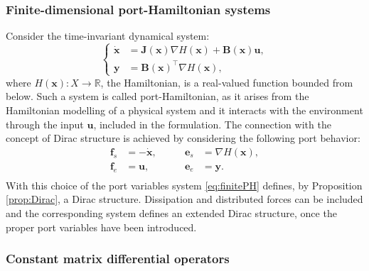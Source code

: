 \subsubsection{Finite-dimensional port-Hamiltonian systems}
Consider the time-invariant dynamical system:
\begin{equation}
\label{eq:finitePH}
\begin{cases}
\dot{ \mathbf{x} } &= \mathbf{J}(\mathbf{x}) \nabla H(\mathbf{x}) + \mathbf{B}(\mathbf{x})\mathbf{u}, \\
\mathbf{y} &= \mathbf{B}(\mathbf{x})^\top \nabla H(\mathbf{x}),
\end{cases}
\end{equation}
where $ H(\mathbf{x}) : X \rightarrow \mathbb{R} $, the Hamiltonian, is a real-valued function bounded from below. Such a system is called port-Hamiltonian, as it arises from the Hamiltonian modelling of a physical system and it interacts with the environment through the input $\mathbf{u}$, included in the formulation. The connection with the concept of Dirac structure is achieved by considering the following port behavior:
\begin{equation}
\begin{aligned}
\mathbf{f}_s &= - \dot{\mathbf{x}}, \qquad 
&\mathbf{e}_s &= \nabla{H}(\mathbf{x}), \\
\mathbf{f}_e &= \mathbf{u}, \qquad
&\mathbf{e}_e &= \mathbf{y}. \\
\end{aligned}
\end{equation}
With this choice of the port variables system \eqref{eq:finitePH} defines, by Proposition \ref{prop:Dirac}, a Dirac structure. Dissipation and distributed forces can be included and the corresponding system defines an extended Dirac structure, once the proper port variables have been introduced.

\subsubsection{Constant matrix differential operators}


